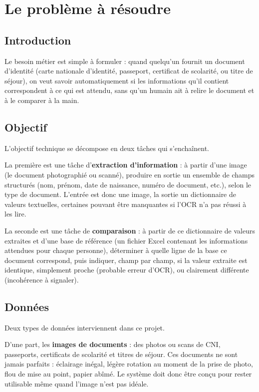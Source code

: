 \chapter{Le problème à résoudre}
\minitoc
\newpage

\section{Introduction}

Le besoin métier est simple à formuler : quand quelqu'un fournit un document d'identité (carte nationale d'identité, passeport, certificat de scolarité, ou titre de séjour), on veut savoir automatiquement si les informations qu'il contient correspondent à ce qui est attendu, sans qu'un humain ait à relire le document et à le comparer à la main.

\section{Objectif}

L'objectif technique se décompose en deux tâches qui s'enchaînent.

La première est une tâche d'\textbf{extraction d'information} : à partir d'une image (le document photographié ou scanné), produire en sortie un ensemble de champs structurés (nom, prénom, date de naissance, numéro de document, etc.), selon le type de document. L'entrée est donc une image, la sortie un dictionnaire de valeurs textuelles, certaines pouvant être manquantes si l'OCR n'a pas réussi à les lire.

La seconde est une tâche de \textbf{comparaison} : à partir de ce dictionnaire de valeurs extraites et d'une base de référence (un fichier Excel contenant les informations attendues pour chaque personne), déterminer à quelle ligne de la base ce document correspond, puis indiquer, champ par champ, si la valeur extraite est identique, simplement proche (probable erreur d'OCR), ou clairement différente (incohérence à signaler).

\section{Données}

Deux types de données interviennent dans ce projet.

D'une part, les \textbf{images de documents} : des photos ou scans de CNI, passeports, certificats de scolarité et titres de séjour. Ces documents ne sont jamais parfaits : éclairage inégal, légère rotation au moment de la prise de photo, flou de mise au point, papier abîmé. Le système doit donc être conçu pour rester utilisable même quand l'image n'est pas idéale.


